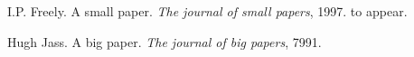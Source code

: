 \begin{thebibliography}{1}

I.P. Freely.
\newblock A small paper.
\newblock \emph{The journal of small papers}, 1997.
\newblock to appear.

Hugh Jass.
\newblock A big paper.
\newblock \emph{The journal of big papers}, 7991.

\end{thebibliography}
